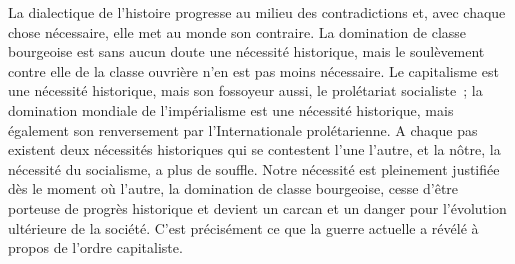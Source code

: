 \documentclass[french,twoside]{book} %
\begin{document}
La dialectique de l’histoire progresse au milieu des contradictions et, avec chaque chose nécessaire, elle met au monde son contraire. La domination de classe bourgeoise est sans aucun doute une nécessité historique, mais le soulèvement contre elle de la classe ouvrière n’en est pas moins nécessaire. Le capitalisme est une nécessité historique, mais son fossoyeur aussi, le prolétariat socialiste ; la domination mondiale de l’impérialisme est une nécessité historique, mais également son renversement par l’Internationale prolétarienne. A chaque pas existent deux nécessités historiques qui se contestent l’une l’autre, et la nôtre, la nécessité du socialisme, a plus de souffle. Notre nécessité est pleinement justifiée dès le moment où l’autre, la domination de classe bourgeoise, cesse d’être porteuse de progrès historique et devient un carcan et un danger pour l’évolution ultérieure de la société. C'est précisément ce que la guerre actuelle a révélé à propos de l’ordre capitaliste.\par
\end{document}
